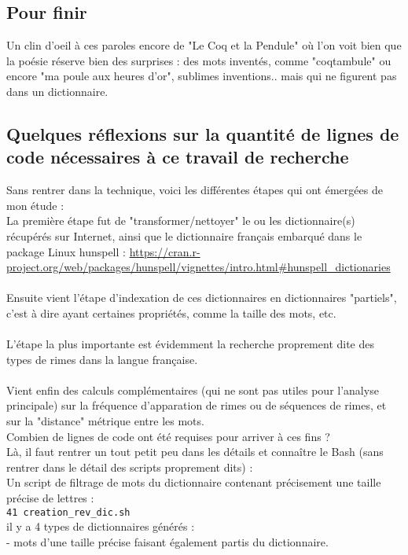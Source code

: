 \documentclass[french]{article}
\begin{document}
\subsection{Pour finir}
Un clin d'oeil à ces paroles encore de "Le Coq et la Pendule" où l'on voit bien que la poésie réserve bien des surprises : des mots inventés, comme "coqtambule" ou encore "ma poule aux heures d'or", sublimes inventions.. mais qui ne figurent pas dans un dictionnaire.
\newpage
\begin{appendix}
\section{Quelques réflexions sur la quantité de lignes de code nécessaires à ce travail de recherche}
Sans rentrer dans la technique, voici les différentes étapes qui ont émergées de mon étude :\\
La première étape fut de "transformer/nettoyer" le ou les dictionnaire(s) récupérés sur Internet, ainsi que le dictionnaire français embarqué dans le package Linux hunspell : \url{https://cran.r-project.org/web/packages/hunspell/vignettes/intro.html#hunspell_dictionaries}\\
\\
Ensuite vient l'étape d'indexation de ces dictionnaires en dictionnaires "partiels", c'est à dire ayant certaines propriétés, comme la taille des mots, etc.\\
\\
L'étape la plus importante est évidemment la recherche proprement dite des types de rimes dans la langue française.\\
\\
Vient enfin des calculs complémentaires (qui ne sont pas utiles pour l'analyse principale) sur la fréquence d'apparation de rimes ou de séquences  de rimes, et sur la "distance" métrique entre les mots.\\
Combien de lignes de code ont été requises pour arriver à ces fins ?\\
Là, il faut rentrer un tout petit peu dans les détails et connaître le Bash (sans rentrer dans le détail des scripts proprement dits) :\\
Un script de filtrage de mots du dictionnaire contenant précisement une taille précise de lettres :\\
\texttt{41 creation\_rev\_dic.sh}\\
il y a 4 types de dictionnaires générés :\\
- mots d'une taille précise faisant également partis du dictionnaire.\\

\end{appendix}
\end{document}
